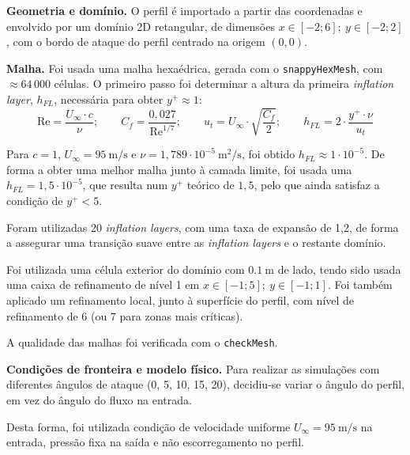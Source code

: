 \begin{etapas}
  \item \textbf{Geometria e domínio.} O perfil é importado a partir das
      coordenadas e envolvido por um domínio 2D retangular, de dimensões $x\in[-2;6];\ y\in[-2;2]$, com o bordo de ataque do perfil centrado na origem $(0,0)$.

  \item \textbf{Malha.} Foi usada uma malha hexaédrica, gerada com o \texttt{snappyHexMesh}, com $\approx 64\,000$ células. O primeiro passo foi determinar a altura da primeira \textit{inflation layer}, $h_{FL}$, necessária para obter $y^+\approx1$:
  \begin{equation}
      \mathrm{Re} = \frac{U_\infty \cdot c}{\nu}; \qquad C_f = \frac{0{,}027}{\mathrm{Re}^{1/7}}; \qquad u_t = U_\infty \cdot \sqrt{\frac{C_f}{2}}; \qquad h_{FL} = 2 \cdot \frac{y^+ \cdot \nu}{u_t}
      \label{eq:y+}
  \end{equation}

  Para $c=1$, $U_\infty=\SI{95}{\meter\per\second}$ e $\nu=1{,}789\cdot10^{-5}\ \unit{\meter^2\per\second}$, foi obtido $h_{FL}\approx 1\cdot10^{-5}$. De forma a obter uma melhor malha junto à camada limite, foi usada uma $h_{FL} = 1{,}5\cdot10^{-5}$, que resulta num $y^+$ teórico de $1{,}5$, pelo que ainda satisfaz a condição de $y^+<5$.

  Foram utilizadas 20 \textit{inflation layers}, com uma taxa de expansão de 1,2, de forma a assegurar uma transição suave entre as \textit{inflation layers} e o restante domínio.

  Foi utilizada uma célula exterior do domínio com $\SI{0.1}{\meter}$ de lado, tendo sido usada uma caixa de refinamento de nível 1 em $x\in[-1;5];\ y\in[-1;1]$. Foi também aplicado um refinamento local, junto à superfície do perfil, com nível de refinamento de 6 (ou 7 para zonas mais críticas).

  A qualidade das malhas foi verificada com o \texttt{checkMesh}.

  \item \textbf{Condições de fronteira e modelo físico.} Para realizar as simulações com diferentes ângulos de ataque (0\textdegree, 5\textdegree, 10\textdegree, 15\textdegree, 20\textdegree), decidiu-se variar o ângulo do perfil, em vez do ângulo do fluxo na entrada. 

  Desta forma, foi utilizada condição de velocidade uniforme $U_\infty = \SI{95}{\meter\per\second}$ na entrada, pressão fixa na saída e não escorregamento no perfil.


\end{etapas}
